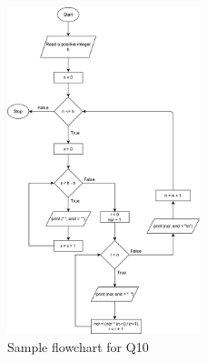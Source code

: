 \documentclass{article}
\newcommand{\comment}[1]{}
\begin{document}
    \begin{figure}[ht]
        \centering
        \includegraphics[width=0.5\textwidth]{Q10.png}
        \caption{Sample flowchart for Q10}
        \label{Q10}
    \end{figure}
    
    \clearpage

\comment{

\begin{flushleft}

\textbf{Q 1. } 

\end{flushleft}

\begin{flushleft}

\textbf{Ans. } 

\end{flushleft}

\begin{flushleft}

\textbf{Grading. }

\end{flushleft}

\begin{figure}[ht]
    \centering
    \texttt{[image: ]}
    \caption{Sample flowchart for Q}
    \label{Q}
\end{figure}

\clearpage
}
\end{document}
